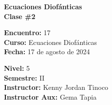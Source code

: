 \begin{center} \textbf
{
    \Large Ecuaciones Diofánticas \\ \vspace{2mm}Clase \#2
}
\end{center}

\begin{multicols}{2}
{
    \textbf{Encuentro:} 17\\
    \textbf{Curso:} Ecuaciones Diofánticas\\
    \textbf{Fecha:} 17 de agosto de 2024\\
    \begin{flushright}
        \textbf{Nivel:} 5\\
        \textbf{Semestre:} II\\
        \textbf{Instructor:} Kenny Jordan Tinoco\\
        \textbf{Instructor Aux:} Gema Tapia
    \end{flushright}
}
\end{multicols}

\thispagestyle{first-page-style}